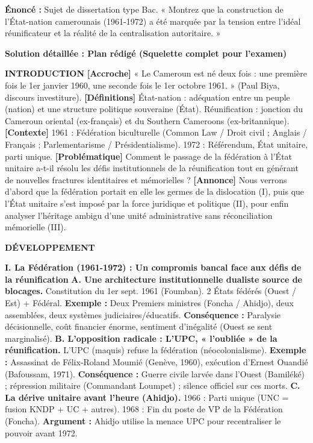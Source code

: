 \documentclass[11pt]{article}
\newcommand{\cle}[1]{{\popxbold\color{popdark}#1}}
\begin{document}
\begin{exoresolu}
\textbf{Énoncé :} Sujet de dissertation type Bac. « Montrez que la construction de l'État-nation camerounais (1961-1972) a été marquée par la tension entre l'idéal réunificateur et la réalité de la centralisation autoritaire. »

\tcblower
\textbf{Solution détaillée : Plan rédigé (Squelette complet pour l'examen)}

\textbf{INTRODUCTION}
\textbf{[Accroche]} « Le Cameroun est né deux fois : une première fois le 1er janvier 1960, une seconde fois le 1er octobre 1961. » (Paul Biya, discours investiture).
\textbf{[Définitions]} \cle{État-nation} : adéquation entre un peuple (nation) et une structure politique souveraine (État). \cle{Réunification} : jonction du Cameroun oriental (ex-français) et du Southern Cameroons (ex-britannique).
\textbf{[Contexte]} 1961 : Fédération biculturelle (Common Law / Droit civil ; Anglais / Français ; Parlementarisme / Présidentialisme). 1972 : Référendum, État unitaire, parti unique.
\textbf{[Problématique]} Comment le passage de la fédération à l'État unitaire a-t-il résolu les défis institutionnels de la réunification tout en générant de nouvelles fractures identitaires et mémorielles ?
\textbf{[Annonce]} Nous verrons d'abord que la fédération portait en elle les germes de la dislocation (I), puis que l'État unitaire s'est imposé par la force juridique et politique (II), pour enfin analyser l'héritage ambigu d'une unité administrative sans réconciliation mémorielle (III).

\textbf{DÉVELOPPEMENT}

\textbf{I. La Fédération (1961-1972) : Un compromis bancal face aux défis de la réunification}
\textbf{A. Une architecture institutionnelle dualiste source de blocages.}
Constitution du 1er sept. 1961 (Foumban). 2 États fédérés (Ouest / Est) + Fédéral. \textbf{Exemple :} Deux Premiers ministres (Foncha / Ahidjo), deux assemblées, deux systèmes judiciaires/éducatifs. \textbf{Conséquence :} Paralysie décisionnelle, coût financier énorme, sentiment d'inégalité (Ouest se sent marginalisé).
\textbf{B. L'opposition radicale : L'UPC, « l'oubliée » de la réunification.}
L'UPC (maquis) refuse la fédération (néocolonialisme). \textbf{Exemple :} Assassinat de Félix-Roland Moumié (Genève, 1960), exécution d'Ernest Ouandié (Bafoussam, 1971). \textbf{Conséquence :} Guerre civile larvée dans l'Ouest (Bamiléké) ; répression militaire (Commandant Loumpet) ; silence officiel sur ces morts.
\textbf{C. La dérive unitaire avant l'heure (Ahidjo).}
1966 : Parti unique (UNC = fusion KNDP + UC + autres). 1968 : Fin du poste de VP de la Fédération (Foncha). \textbf{Argument :} Ahidjo utilise la menace UPC pour recentraliser le pouvoir avant 1972.


\end{exoresolu}
\end{document}
